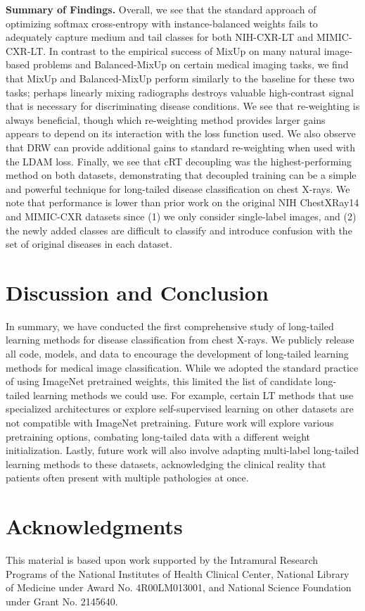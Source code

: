 \documentclass[runningheads]{llncs}
\begin{document}
\textbf{Summary of Findings.} Overall, we see that the standard approach of optimizing softmax cross-entropy with instance-balanced weights fails to adequately capture medium and tail classes for both NIH-CXR-LT and MIMIC-CXR-LT. In contrast to the empirical success of MixUp on many natural image-based problems and Balanced-MixUp on certain medical imaging tasks, we find that MixUp and Balanced-MixUp perform similarly to the baseline for these two tasks; perhaps linearly mixing radiographs destroys valuable high-contrast signal that is necessary for discriminating disease conditions. We see that re-weighting is always beneficial, though which re-weighting method provides larger gains appears to depend on its interaction with the loss function used. We also observe that DRW can provide additional gains to standard re-weighting when used with the LDAM loss. Finally, we see that cRT decoupling was the highest-performing method on both datasets, demonstrating that decoupled training can be a simple and powerful technique for long-tailed disease classification on chest X-rays.
We note that performance is lower than prior work on the original NIH ChestXRay14 and MIMIC-CXR datasets since (1) we only consider single-label images, and (2) the newly added classes are difficult to classify and introduce confusion with the set of original diseases in each dataset.



\section{Discussion and Conclusion}
In summary, we have conducted the first comprehensive study of long-tailed learning methods for disease classification from chest X-rays. We publicly release all code, models, and data to encourage the development of long-tailed learning methods for medical image classification. While we adopted the standard practice of using ImageNet pretrained weights, this limited the list of candidate long-tailed learning methods we could use. For example, certain LT methods that use specialized architectures \cite{shu2019meta,wang2020long} or explore self-supervised learning \cite{jiang2021self,marrakchifighting2021} on other datasets are not compatible with ImageNet pretraining.
Future work will explore various pretraining options, combating long-tailed data with a different weight initialization. Lastly, future work will also involve adapting multi-label long-tailed learning methods to these datasets, acknowledging the clinical reality that patients often present with multiple pathologies at once.


\section{Acknowledgments}

This material is based upon work supported by the Intramural Research Programs of the National Institutes of Health Clinical Center, National Library of Medicine under Award No. 4R00LM013001, and National Science Foundation under Grant No. 2145640.




\end{document}
